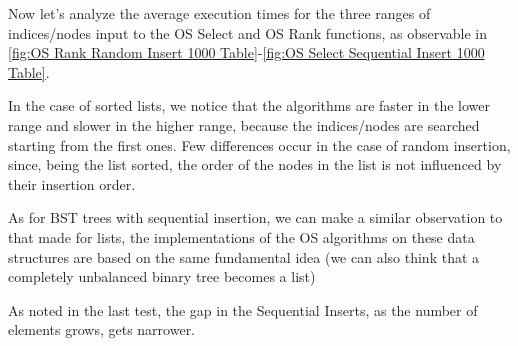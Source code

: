 \documentclass[11pt]{article}
\begin{document}
Now let's analyze the average execution times for the three ranges of indices/nodes input to the OS Select and OS Rank functions, as observable in \ref{fig:OS Rank Random Insert 1000 Table}-\ref{fig:OS Select Sequential Insert 1000 Table}. 

In the case of sorted lists, we notice that the algorithms are faster in the lower range and slower in the higher range, because the indices/nodes are searched starting from the first ones. Few differences occur in the case of random insertion, since, being the list sorted, the order of the nodes in the list is not influenced by their insertion order.

As for BST trees with sequential insertion, we can make a similar observation to that made for lists, the implementations of the OS algorithms on these data structures are based on the same fundamental idea (we can also think that a completely unbalanced binary tree becomes a list)

As noted in the last test, the gap in the Sequential Inserts, as the number of elements grows, gets narrower.
\end{document}
